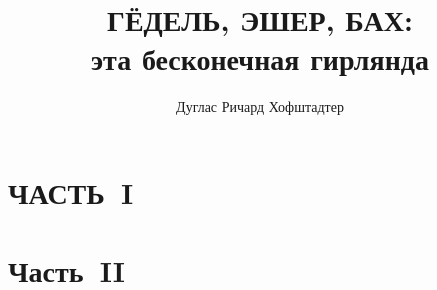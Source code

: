 \documentclass[a4paper,12pt,oneside,openany]{memoir}
\title{ГЁДЕЛЬ, ЭШЕР, БАХ: \\ эта бесконечная гирлянда}
\author{Дуглас Ричард Хофштадтер}
\begin{document}
\frontmatter

\maketitle

\mainmatter



\begingroup
\hypersetup{hidelinks}
\clearpage
\tableofcontents
\clearpage
\endgroup





\part{ЧАСТЬ~I}



\clearpage

\clearpage

\clearpage

\clearpage

\clearpage

\clearpage

\clearpage

\clearpage

\clearpage
% 

\part{Часть~II}


\clearpage

\end{document}

